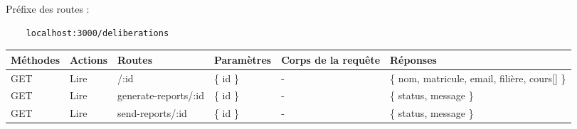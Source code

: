 Préfixe des routes :
\begin{lstlisting}
    localhost:3000/deliberations
\end{lstlisting}

\begin{center}
    \begin{tabularx}{1\textwidth} {
            | >{\raggedright\arraybackslash}X
            | >{\centering\arraybackslash}X
            | >{\centering\arraybackslash}X
            | >{\centering\arraybackslash}X
            | >{\centering\arraybackslash}X
            | >{\raggedleft\arraybackslash}X |
        }
        \hline
            Méthodes & Actions & Routes & Paramètres & Corps de la requête & Réponses \\
        \hline
            GET  & Lire & /:id &  \{ id \} & - & \{ nom, matricule, email, filière, cours[] \} \\
        \hline
            GET  & Lire & generate-reports/:id &  \{ id \} & - & \{ status, message \} \\
        \hline
            GET  & Lire & send-reports/:id &  \{ id \} & - & \{ status, message \} \\
        \hline
    \end{tabularx}
\end{center}
\pagebreak